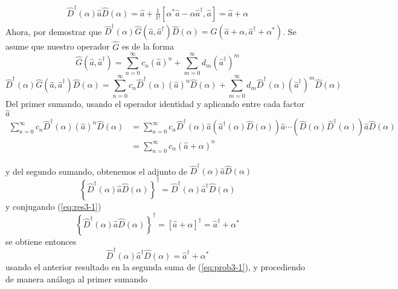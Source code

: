 \begin{enumerate}
        \begin{align*}
          \hat{D}^{\dagger}(\alpha) \hat{a} \hat{D}(\alpha) = \hat{a} + \frac{1}{1!}[\alpha^{*}\hat{a} - \alpha\hat{a}^{\dagger},\hat{a}] = \hat{a} + \alpha
        \end{align*}
        Ahora, por demostrar que $\hat{D}^{\dagger}(\alpha) \hat{G}(\hat{a}, \hat{a}^{\dagger}) \hat{D}(\alpha) = \hat{G}(\hat{a} + \alpha, \hat{a}^{\dagger} + \alpha^{*}) $. Se asume que nuestro operador $\hat{G}$ es de la forma
        \begin{equation*}
          \hat{G}(\hat{a}, \hat{a}^{\dagger}) = \sum_{n=0}^{\infty} c_n (\hat{a})^n + \sum_{m=0}^{\infty} d_m (\hat{a}^{\dagger})^{m}
        \end{equation*}
        \begin{equation}
          \hat{D}^{\dagger}(\alpha)\hat{G}(\hat{a}, \hat{a}^{\dagger})\hat{D}(\alpha) = \sum_{n=0}^{\infty} c_n \hat{D}^{\dagger}(\alpha) (\hat{a})^{n} \hat{D}(\alpha) + \sum_{m=0}^{\infty} d_m \hat{D}^{\dagger}(\alpha) (\hat{a}^{\dagger})^{m} \hat{D}(\alpha) \label{eq:prob3-1}
        \end{equation}
        Del primer sumando, usando el operador identidad y aplicando entre cada factor $\hat{a}$
        \begin{align}
          \sum_{n=0}^{\infty} c_n \hat{D}^{\dagger}(\alpha) (\hat{a})^{n} \hat{D}(\alpha) & = \sum_{n=0}^{\infty} c_n \hat{D}^{\dagger}(\alpha)\hat{a} \left( \hat{a}^{\dagger}(\alpha)\hat{D}(\alpha)\right)\hat{a} \cdots \left( \hat{D}(\alpha)\hat{D}^{\dagger}(\alpha) \right)\hat{a} \hat{D}(\alpha) \nonumber \\
                                                                                          & = \sum_{n=0}^{\infty} c_n (\hat{a} + \alpha)^n \label{eq:res3-1}
        \end{align}

        y del segundo sumando, obtenemos el adjunto de $\hat{D}^{\dagger}(\alpha)\hat{a} \hat{D}(\alpha)$
        \begin{equation}
          \left\{ \hat{D}^{\dagger}(\alpha) \hat{a} \hat{D}(\alpha) \right\}^\dagger = \hat{D}^{\dagger}(\alpha) \hat{a}^{\dagger} \hat{D}(\alpha)
        \end{equation}
        y conjugando (\ref{eq:res3-1})
        \begin{equation*}
          \left\{ \hat{D}^{\dagger}(\alpha)\hat{a} \hat{D}(\alpha) \right\}^\dagger = [\hat{a} + \alpha]^\dagger = \hat{a}^{\dagger}+\alpha^{*}
        \end{equation*}
        se obtiene entonces
        \begin{equation*}
          \hat{D}^{\dagger}(\alpha) \hat{a}^{\dagger} \hat{D}(\alpha) = \hat{a}^{\dagger} + \alpha^{*}
        \end{equation*}
        usando el anterior resultado en la segunda suma de (\ref{eq:prob3-1}), y procediendo de manera análoga al primer sumando


\end{enumerate}
